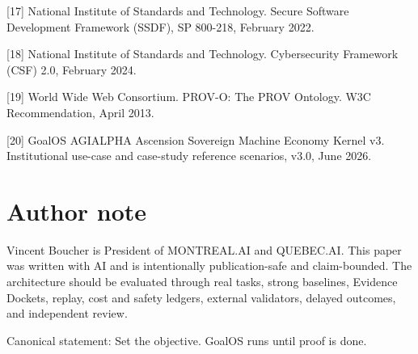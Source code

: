 {[}17{]} National Institute of Standards and Technology. Secure Software
Development Framework (SSDF), SP 800-218, February 2022.

{[}18{]} National Institute of Standards and Technology. Cybersecurity
Framework (CSF) 2.0, February 2024.

{[}19{]} World Wide Web Consortium. PROV-O: The PROV Ontology. W3C
Recommendation, April 2013.

{[}20{]} GoalOS AGIALPHA Ascension Sovereign Machine Economy Kernel v3.
Institutional use-case and case-study reference scenarios, v3.0, June
2026.

\section{Author note}\label{author-note}

Vincent Boucher is President of MONTREAL.AI and QUEBEC.AI. This paper
was written with AI and is intentionally publication-safe and
claim-bounded. The architecture should be evaluated through real tasks,
strong baselines, Evidence Dockets, replay, cost and safety ledgers,
external validators, delayed outcomes, and independent review.

Canonical statement: Set the objective. GoalOS runs until proof is done.
